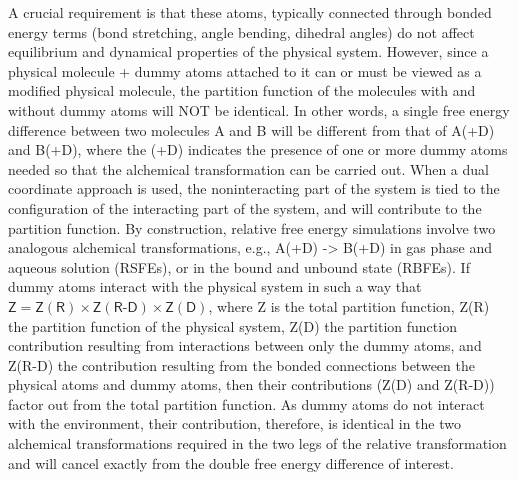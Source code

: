 \documentclass[9pt,bestpractices]{livecoms}
\begin{document}
A crucial requirement is that these atoms, typically connected through bonded energy terms (bond stretching, angle bending, dihedral angles) do not affect equilibrium and dynamical properties of the physical system. However, since a physical molecule + dummy atoms attached to it can or must be viewed as a modified physical molecule, the partition function of the molecules with and without dummy atoms will NOT be identical. In other words, a single free energy difference between two molecules A and B will be different from that of A(+D) and B(+D), where the (+D) indicates the presence of one or more dummy atoms needed so that the alchemical transformation can be carried out. When a dual coordinate approach is used, the noninteracting part of the system is tied to the configuration of the interacting part of the system, and will contribute to the partition function. By construction, relative free energy simulations involve two analogous alchemical transformations, e.g., A(+D) -> B(+D) in gas phase and aqueous solution (RSFEs), or in the bound and unbound state (RBFEs). If dummy atoms  interact with the physical system in such a way that $\mathsf{Z = Z(R) \times Z(R\text{-}D) \times Z(D)}$, where Z is the total partition function, Z(R) the partition function of the physical system, Z(D) the partition function contribution resulting from interactions between only the dummy atoms, and Z(R-D) the contribution resulting from the bonded connections between the physical atoms and dummy atoms, then their contributions (Z(D) and Z(R-D)) factor out from the total partition function. As dummy atoms do not interact with the environment, their contribution, therefore, is identical in the two alchemical transformations required in the two legs of the relative transformation and will cancel exactly from the double free energy difference of interest.
\end{document}
